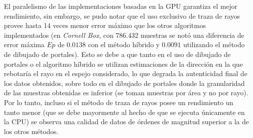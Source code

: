 El paralelismo de las implementaciones basadas en la GPU garantiza el mejor rendimiento, sin embargo, se pudo notar que el uso exclusivo de traza de rayos provee hasta 14 veces menor error máximo que los otros algoritmos implementados (en \textit{Cornell Box}, con 786.432 muestras se notó una diferencia de error máxima $Ep$ de $0.0138$ con el método híbrido y  $0.0091$ utilizando el método de dibujado de portales). Esto se debe a que tanto en el uso de dibujado de portales o el algoritmo híbrido se utilizan estimaciones de la dirección en la que rebotaría el rayo en el espejo considerado, lo que degrada la autenticidad final de los datos obtenidos, sobre todo en el dibujado de portales donde la granularidad de las muestras obtenidas es inferior (se toman muestras por área y no por rayo). Por lo tanto, incluso si el método de traza de rayos posee un rendimiento un tanto menor (que se debe mayormente al hecho de que se ejecuta únicamente en la CPU) se observa una calidad de datos de órdenes de magnitud superior a la de los otros métodos.

